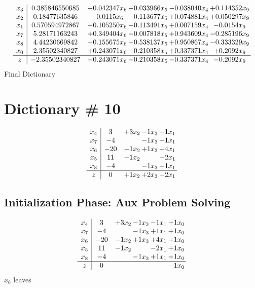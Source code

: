 \documentclass[12pt]{article}
\begin{document}
 \[\begin{array}{c| c c@{\hskip 2pt} c@{\hskip 2pt} c@{\hskip 2pt} c@{\hskip 2pt} }
 x_{3}   &  0.385846550685 & -0.042347 x_{6} & -0.033966 x_{5} & -0.038040 x_{4} & + 0.114352 x_{9}\\
 x_{2}   &  0.18477635846 & -0.0115 x_{6} & -0.113677 x_{5} & + 0.074881 x_{4} & + 0.050297 x_{9}\\
 x_{1}   &  0.570594972867 & -0.105250 x_{6} & + 0.113491 x_{5} & + 0.007159 x_{4} & -0.0154 x_{9}\\
 x_{7}   &  5.28171163243 & + 0.349404 x_{6} & -0.007818 x_{5} & + 0.943609 x_{4} & -0.285196 x_{9}\\
 x_{8}   &  4.44230669842 & -0.155675 x_{6} & + 0.538137 x_{5} & + 0.950867 x_{4} & -0.333329 x_{9}\\
 x_{0}   &  2.35502340827 & + 0.243071 x_{6} & + 0.210358 x_{5} & + 0.337371 x_{4} & + 0.2092 x_{9}\\
\hline
z    &  -2.35502340827 & -0.243071 x_{6} & -0.210358 x_{5} & -0.337371 x_{4} & -0.2092 x_{9}\\
\end{array}\]
Final Dictionary

\section{Dictionary \# 10}

\[\begin{array}{c| c c@{\hskip 2pt} c@{\hskip 2pt} c@{\hskip 2pt} }
 x_{4}   &  3 & + 3 x_{2} & -1 x_{3} & -1 x_{1}\\
 x_{7}   &  -4  &   & -1 x_{3} & + 1 x_{1}\\
 x_{6}   &  -20 & -1 x_{2} & + 1 x_{3} & + 4 x_{1}\\
 x_{5}   &  11 & -1 x_{2} &   & -2 x_{1}\\
 x_{8}   &  -4  &   & -1 x_{3} & + 1 x_{1}\\
\hline
z    &  0 & + 1 x_{2} & + 2 x_{3} & -2 x_{1}\\
\end{array}\]
\subsection{Initialization Phase: Aux Problem Solving}
\[\begin{array}{c| c c@{\hskip 2pt} c@{\hskip 2pt} c@{\hskip 2pt} c@{\hskip 2pt} }
 x_{4}   &  3 & + 3 x_{2} & -1 x_{3} & -1 x_{1} & + 1 x_{0}\\
 x_{7}   &  -4  &   & -1 x_{3} & + 1 x_{1} & + 1 x_{0}\\
 x_{6}   &  -20 & -1 x_{2} & + 1 x_{3} & + 4 x_{1} & + 1 x_{0}\\
 x_{5}   &  11 & -1 x_{2} &   & -2 x_{1} & + 1 x_{0}\\
 x_{8}   &  -4  &   & -1 x_{3} & + 1 x_{1} & + 1 x_{0}\\
\hline
z    &  0  &    &    &   & -1 x_{0}\\
\end{array}\]
$ x_{6} $ leaves 
\end{document}
